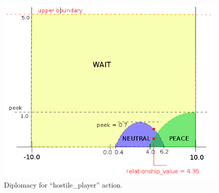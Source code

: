 \begin{figure}[h!]
	\centering
	\includegraphics[width=\textwidth]{gfx/diplomacy3.png}
	\caption{Diplomacy for ``hostile\_player'' action.}
	\label{fig:diplomacy3}
\end{figure}
